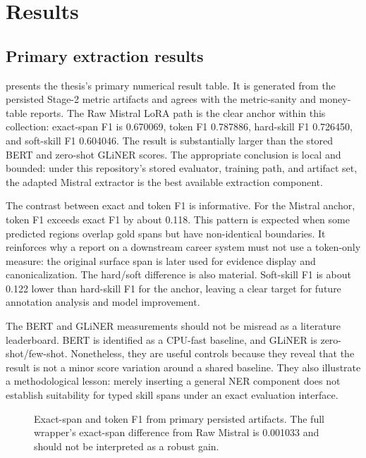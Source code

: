 \chapter{Results}
\label{ch:results}

\section{Primary extraction results}

 presents the thesis's primary numerical result table. It is generated from the persisted Stage-2 metric artifacts and agrees with the metric-sanity and money-table reports. The Raw Mistral LoRA path is the clear anchor within this collection: exact-span F1 is 0.670069, token F1 0.787886, hard-skill F1 0.726450, and soft-skill F1 0.604046. The result is substantially larger than the stored BERT and zero-shot GLiNER scores. The appropriate conclusion is local and bounded: under this repository's stored evaluator, training path, and artifact set, the adapted Mistral extractor is the best available extraction component.



The contrast between exact and token F1 is informative. For the Mistral anchor, token F1 exceeds exact F1 by about 0.118. This pattern is expected when some predicted regions overlap gold spans but have non-identical boundaries. It reinforces why a report on a downstream career system must not use a token-only measure: the original surface span is later used for evidence display and canonicalization. The hard/soft difference is also material. Soft-skill F1 is about 0.122 lower than hard-skill F1 for the anchor, leaving a clear target for future annotation analysis and model improvement.

The BERT and GLiNER measurements should not be misread as a literature leaderboard. BERT is identified as a CPU-fast baseline, and GLiNER is zero-shot/few-shot. Nonetheless, they are useful controls because they reveal that the result is not a minor score variation around a shared baseline. They also illustrate a methodological lesson: merely inserting a general NER component does not establish suitability for typed skill spans under an exact evaluation interface.

\begin{figure}[H]
\centering

\caption{Exact-span and token F1 from primary persisted artifacts. The full wrapper's exact-span difference from Raw Mistral is 0.001033 and should not be interpreted as a robust gain.}
\label{fig:results-chart}
\end{figure}

